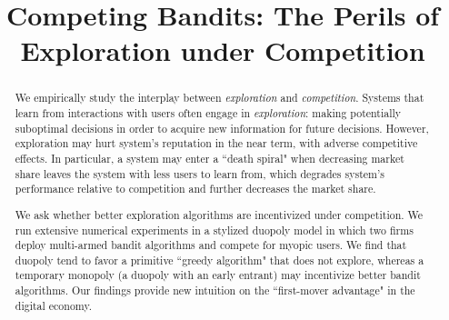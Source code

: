 \documentclass[letterpaper]{article}
\theoremstyle{definition}
\begin{document}


\title{Competing Bandits: The Perils of Exploration under Competition}


\maketitle


\begin{abstract}
We empirically study the interplay between \textit{exploration} and \textit{competition}. Systems that learn from interactions with users
often engage in \emph{exploration}: making potentially suboptimal decisions in order to acquire new information for future decisions. However, exploration may hurt system's reputation in the near term, with adverse competitive effects. In particular, a system may enter a ``death spiral" when decreasing market share leaves the system with less users to learn from, which degrades system's performance relative to competition and further decreases the market share.

We ask whether better exploration algorithms are incentivized under competition. We run extensive numerical experiments in a stylized duopoly model in which two firms deploy multi-armed bandit algorithms and compete for myopic users.  We find that duopoly  tend to favor a primitive ``greedy algorithm" that does not explore, whereas a temporary monopoly (a duopoly with an early entrant) may incentivize better bandit algorithms. Our findings provide new intuition on the ``first-mover advantage" in the digital economy.
\end{abstract}
\end{document}
